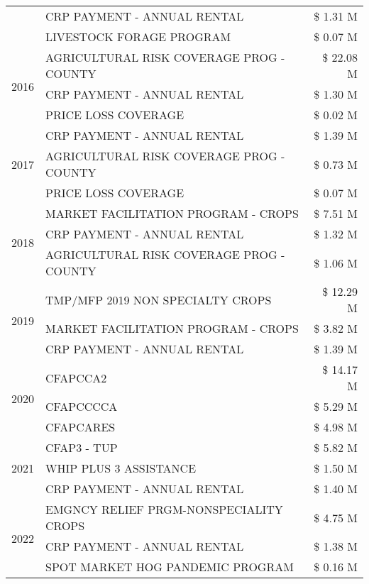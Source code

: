 \begin{tabular}{llr}
 & CRP PAYMENT - ANNUAL RENTAL & \$ 1.31 M \\
 & LIVESTOCK FORAGE PROGRAM & \$ 0.07 M \\
\cline{1-3}
\multirow[t]{3}{*}{2016} & AGRICULTURAL RISK COVERAGE PROG - COUNTY & \$ 22.08 M \\
 & CRP PAYMENT - ANNUAL RENTAL & \$ 1.30 M \\
 & PRICE LOSS COVERAGE & \$ 0.02 M \\
\cline{1-3}
\multirow[t]{3}{*}{2017} & CRP PAYMENT - ANNUAL RENTAL & \$ 1.39 M \\
 & AGRICULTURAL RISK COVERAGE PROG - COUNTY & \$ 0.73 M \\
 & PRICE LOSS COVERAGE & \$ 0.07 M \\
\cline{1-3}
\multirow[t]{3}{*}{2018} & MARKET FACILITATION PROGRAM - CROPS & \$ 7.51 M \\
 & CRP PAYMENT - ANNUAL RENTAL & \$ 1.32 M \\
 & AGRICULTURAL RISK COVERAGE PROG - COUNTY & \$ 1.06 M \\
\cline{1-3}
\multirow[t]{3}{*}{2019} & TMP/MFP 2019 NON SPECIALTY CROPS & \$ 12.29 M \\
 & MARKET FACILITATION PROGRAM - CROPS & \$ 3.82 M \\
 & CRP PAYMENT - ANNUAL RENTAL & \$ 1.39 M \\
\cline{1-3}
\multirow[t]{3}{*}{2020} & CFAPCCA2 & \$ 14.17 M \\
 & CFAPCCCCA & \$ 5.29 M \\
 & CFAPCARES & \$ 4.98 M \\
\cline{1-3}
\multirow[t]{3}{*}{2021} & CFAP3 - TUP & \$ 5.82 M \\
 & WHIP PLUS 3 ASSISTANCE & \$ 1.50 M \\
 & CRP PAYMENT - ANNUAL RENTAL & \$ 1.40 M \\
\cline{1-3}
\multirow[t]{3}{*}{2022} & EMGNCY RELIEF PRGM-NONSPECIALITY CROPS & \$ 4.75 M \\
 & CRP PAYMENT - ANNUAL RENTAL & \$ 1.38 M \\
 & SPOT MARKET HOG PANDEMIC PROGRAM & \$ 0.16 M \\
\cline{1-3}
\bottomrule
\end{tabular}
